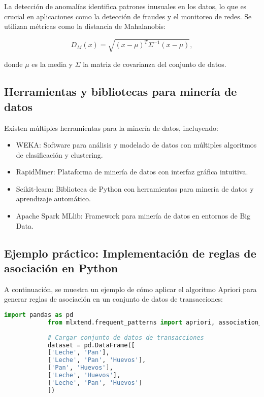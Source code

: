 \begin{itemize}
		La detección de anomalías identifica patrones inusuales en los datos, lo que es crucial en aplicaciones como la detección de fraudes y el monitoreo de redes. Se utilizan métricas como la distancia de Mahalanobis:
		
		\begin{equation}
			D_M(x) = \sqrt{(x - \mu)^T \Sigma^{-1} (x - \mu)},
		\end{equation}
		
		donde \( \mu \) es la media y \( \Sigma \) la matriz de covarianza del conjunto de datos.
		
		\subsection{Herramientas y bibliotecas para minería de datos}
		
		Existen múltiples herramientas para la minería de datos, incluyendo:
		
		\begin{itemize}
			\item WEKA: Software para análisis y modelado de datos con múltiples algoritmos de clasificación y clustering.
			\item RapidMiner: Plataforma de minería de datos con interfaz gráfica intuitiva.
			\item Scikit-learn: Biblioteca de Python con herramientas para minería de datos y aprendizaje automático.
			\item Apache Spark MLlib: Framework para minería de datos en entornos de Big Data.
		\end{itemize}
		
		\subsection{Ejemplo práctico: Implementación de reglas de asociación en Python}
		
		A continuación, se muestra un ejemplo de cómo aplicar el algoritmo Apriori para generar reglas de asociación en un conjunto de datos de transacciones:
		
		\begin{lstlisting}[language=Python, caption={Reglas de asociación con Apriori en Python}]
			import pandas as pd
			from mlxtend.frequent_patterns import apriori, association_rules
			
			# Cargar conjunto de datos de transacciones
			dataset = pd.DataFrame([
			['Leche', 'Pan'],
			['Leche', 'Pan', 'Huevos'],
			['Pan', 'Huevos'],
			['Leche', 'Huevos'],
			['Leche', 'Pan', 'Huevos']
			])
			

\end{lstlisting}
\end{itemize}
